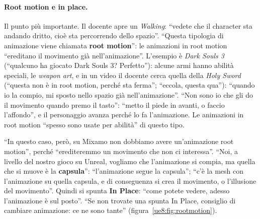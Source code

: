 \paragraph{Root motion e in place.} Il punto più importante. Il docente apre un
\emph{Walking}: ``vedete che il character sta andando dritto, cioè sta percorrendo dello
spazio''. ``Questa tipologia di animazione viene chiamata \textbf{root motion}'': le
animazioni in root motion ``ereditano il movimento già nell'animazione''. L'esempio è
\emph{Dark Souls 3} (``qualcuno ha giocato Dark Souls 3? Perfetto''): alcune armi hanno
abilità speciali, le \emph{weapon art}, e in un video il docente cerca quella della
\emph{Holy Sword} (``questa non è in root motion, perché sta ferma''; ``eccola, questa
qua''): ``quando io la compio, mi sposto nello spazio già nell'animazione''. ``Non sono
io che gli do il movimento quando premo il tasto'': ``metto il piede in avanti, o faccio
l'affondo'', e il personaggio avanza perché lo fa l'animazione. Le animazioni in root
motion ``spesso sono usate per abilità'' di questo tipo.

``In questo caso, però, su Mixamo non dobbiamo avere un'animazione root motion'', perché
``erediteremmo un movimento che non ci interessa''. ``Noi, a livello del nostro gioco su
Unreal, vogliamo che l'animazione si compia, ma quella che si muove è la
\textbf{capsula}'': ``l'animazione segue la capsula''; ``c'è la mesh con l'animazione su
quella capsula, e di conseguenza si crea il movimento, o l'illusione del movimento''.
Quindi si spunta \textbf{In Place}: ``come potete vedere, adesso l'animazione è sul
posto''. ``Se non trovate una spunta In Place, consiglio di cambiare animazione: ce ne
sono tante'' (figura~\ref{ue8:fig:rootmotion}).

